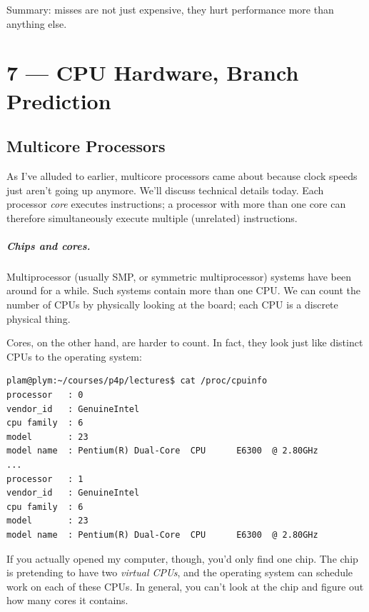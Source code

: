 \documentclass[a4paper]{report}
\begin{document}
Summary: misses are not just expensive, they hurt performance more than anything else.










\chapter*{7 --- CPU Hardware, Branch Prediction}


\section*{Multicore Processors}
As I've alluded to earlier, multicore processors came about because
clock speeds just aren't going up anymore. We'll discuss technical
details today. Each processor \emph{core} executes instructions; a processor with more than one core can therefore simultaneously execute multiple
(unrelated) instructions. 

\paragraph{Chips and cores.} Multiprocessor (usually SMP, or symmetric
multiprocessor) systems have been around for a while. Such systems
contain more than one CPU. We can count the number of CPUs by
physically looking at the board; each CPU is a discrete physical thing.

Cores, on the other hand, are harder to count. In fact, they look just
like distinct CPUs to the operating system:

{\scriptsize \begin{verbatim}
plam@plym:~/courses/p4p/lectures$ cat /proc/cpuinfo
processor	: 0
vendor_id	: GenuineIntel
cpu family	: 6
model		: 23
model name	: Pentium(R) Dual-Core  CPU      E6300  @ 2.80GHz
...
processor	: 1
vendor_id	: GenuineIntel
cpu family	: 6
model		: 23
model name	: Pentium(R) Dual-Core  CPU      E6300  @ 2.80GHz
\end{verbatim}
}
\vspace*{-1em}
If you actually opened my computer, though, you'd only find one chip.
The chip is pretending to have two \emph{virtual CPUs}, and the
operating system can schedule work on each of these CPUs. In general,
you can't look at the chip and figure out how many cores it contains.
\end{document}
